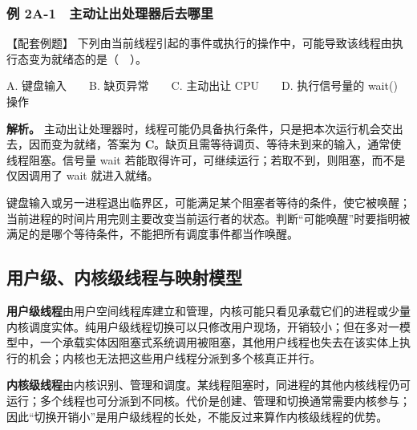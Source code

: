 \subsubsection{例 2A-1　主动让出处理器后去哪里}\label{OS02-ex2-1}

\begin{example}[配套例题]

【配套例题】 下列由当前线程引起的事件或执行的操作中，可能导致该线程由执行态变为就绪态的是（　）。

A. 键盘输入　　B. 缺页异常　　C. 主动出让 CPU　　D. 执行信号量的 wait() 操作

\end{example}

\textbf{解析。} 主动出让处理器时，线程可能仍具备执行条件，只是把本次运行机会交出去，因而变为就绪，答案为 \textbf{C}。缺页且需等待调页、等待未到来的输入，通常使线程阻塞。信号量 wait 若能取得许可，可继续运行；若取不到，则阻塞，而不是仅因调用了 wait 就进入就绪。

键盘输入或另一进程退出临界区，可能满足某个阻塞者等待的条件，使它被唤醒；当前进程的时间片用完则主要改变当前运行者的状态。判断``可能唤醒''时要指明被满足的是哪个等待条件，不能把所有调度事件都当作唤醒。

\subsection{用户级、内核级线程与映射模型}\label{OS02-2-3}

\textbf{用户级线程}由用户空间线程库建立和管理，内核可能只看见承载它们的进程或少量内核调度实体。纯用户级线程切换可以只修改用户现场，开销较小；但在多对一模型中，一个承载实体因阻塞式系统调用被阻塞，其他用户线程也失去在该实体上执行的机会；内核也无法把这些用户线程分派到多个核真正并行。

\textbf{内核级线程}由内核识别、管理和调度。某线程阻塞时，同进程的其他内核线程仍可运行；多个线程也可分派到不同核。代价是创建、管理和切换通常需要内核参与；因此``切换开销小''是用户级线程的长处，不能反过来算作内核级线程的优势。

